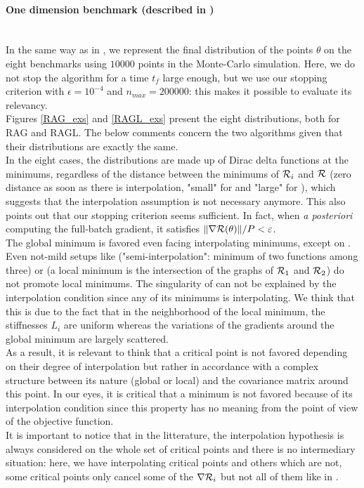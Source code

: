 \paragraph{One dimension benchmark (described in \cite{partI})}
~~\\
In the same way as in \cite{partI}, we represent the final distribution of the points $\theta$ on the eight benchmarks using $10000$ points in the Monte-Carlo simulation. Here, we do not stop the algorithm for a time $t_f$ large enough, but we use our stopping criterion with $\epsilon=10^{-4}$ and $n_{max}=200000$: this makes it possible to evaluate its relevancy. 
\\
Figures \ref{RAG_exs} and \ref{RAGL_exs} present the eight distributions, both for RAG and RAGL. The below comments concern the two algorithms given that their distributions are exactly the same.\\
In the eight cases, the distributions are made up of Dirac delta functions at the minimums, regardless of the distance between the minimums of $\mathcal{R}_i$ and $\mathcal{R}$ (zero distance as
soon as there is interpolation, "small" for \exThree and "large" for \exFour), which suggests that the interpolation assumption is not necessary anymore. This also points out that
our stopping criterion seems sufficient. In fact, when {\em a posteriori} computing the full-batch gradient, it satisfies $\|\nabla \mathcal{R}(\theta)\|/P<\varepsilon$. \\
The global minimum is favored even facing interpolating minimums, except on \exHeight. Even not-mild setups like \exSix ("semi-interpolation": minimum of two functions among three) or \exThree (a local minimum is the intersection of the graphs of $\mathcal{R}_1$ and $\mathcal{R}_2$) do not promote local minimums. The singularity of \exHeight can not be explained by the interpolation condition since any of its minimums is interpolating. We think that this is due to the fact that in the neighborhood of the local minimum, the stiffnesses $L_i$ are uniform whereas the variations of the gradients around the global minimum are largely scattered. \\
As a result, it is relevant to think that a critical point is not favored depending on their degree of interpolation but rather in accordance with a complex structure between its nature (global or local) and the covariance matrix around this point. In our eyes, it is critical that a minimum is not favored because of its interpolation condition since this property has no meaning from the point of view of the objective function. \\
It is important to notice that in the litterature, the interpolation hypothesis is always considered on the whole set of critical points and there is no intermediary situation:
here, we have interpolating critical points and others which are not, some critical points only cancel some of the $\nabla \mathcal{R}_i$ but not all of them like in \exSix.     

